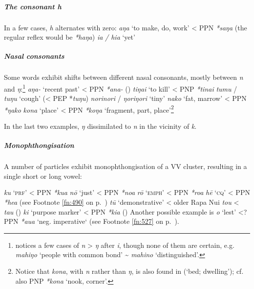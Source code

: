 \subparagraph{The consonant \textit{h}} In a few cases, \textit{h} alternates with zero: 
\ea
\ea
\textit{aŋa} ‘to make, do, work’ {\textless} PPN \textit{*saŋa} (the regular reflex would be \textit{*haŋa})
\ex
\textit{ia} \textit{/ hia} ‘yet’
\z
\z

\newpage 
\subparagraph{Nasal consonants} Some words exhibit shifts between different nasal consonants, mostly between \textit{n} and \textit{ŋ}:\footnote{\label{fn:66}\citet[10]{Blixen1972} notices a few cases of \textit{n} > \textit{ŋ} after \textit{i}, though none of them are certain, e.g. \textit{mahiŋo} ‘people with common bond’ {\textasciitilde}  \textit{mahino} ‘distinguished’.}
\ea
\ea
\textit{{\ꞌ}aŋa-} ‘recent past’ {\textless} PPN \textit{*{\ꞌ}ana-} ()
\ex
\textit{tiŋa{\ꞌ}i} ‘to kill’ {\textless} PNP \textit{*tina{\ꞌ}i}
\ex
\textit{tumu} / \textit{tuŋu} ‘cough’ ({\textless} PEP *\textit{tuŋu})
\ex
\textit{norinori} / \textit{ŋoriŋori} ‘tiny’
\ex
\textit{nako} ‘fat, marrow’ {\textless} PPN \textit{*ŋako}
\ex
\textit{kona} ‘place’ {\textless} PPN \textit{*koŋa} ‘fragment, part, place’\footnote{\label{fn:67}Notice that \textit{kona}, with \textit{n} rather than \textit{ŋ}, is also found in  (‘bed; dwelling’); cf. also PNP \textit{*kona} ‘nook, corner’.}
\z
\z

In the last two examples, \textit{ŋ} dissimilated to \textit{n} in the vicinity of \textit{k}.

\subparagraph{Monophthongisation} A number of particles exhibit monophthongisation of a VV cluster, resulting in a single short or long vowel:

\ea
\ea
\textit{ku} ‘\textsc{prf}’ {\textless} PPN \textit{*kua}
\ex
\textit{nō} ‘just’ {\textless} PPN \textit{*noa}
\ex
\textit{rō} ‘\textsc{emph}’ {\textless} PPN \textit{*roa}
\ex
\textit{hē} ‘\textsc{cq}’ {\textless} PPN \textit{*hea} (see Footnote \ref{fn:490} on p.~\pageref{fn:490})
\ex
\textit{tū} ‘demonstrative’ {\textless} older Rapa Nui \textit{tou} {\textless} \textit{tau} ()
\ex
\textit{ki} ‘purpose marker’ {\textless} PPN \textit{*kia} ()
\ex
Another possible example is \textit{{\ꞌ}o} ‘lest’ {\textless}? PPN \textit{*{\ꞌ}aua} ‘neg. imperative‘ (see Footnote \ref{fn:527} on p.~\pageref{fn:527}).
\z
\z

